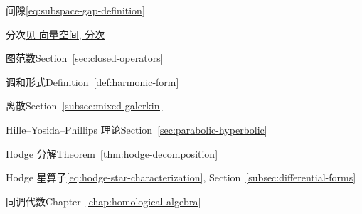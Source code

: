 \par\noindent\hspace*{0em}\label{index:gap}{间隙}\quad \eqref{eq:subspace-gap-definition}

\par\noindent\hspace*{0em}\label{index:grading}{分次}\quad \hyperref[index:vector-space-graded]{{见 向量空间, 分次}}

\par\noindent\hspace*{0em}\label{index:graph-norm}{图范数}\quad Section~\ref{sec:closed-operators}

\par\noindent\hspace*{0em}\label{index:harmonic-form}{调和形式}\quad Definition~\ref{def:harmonic-form}

\par\noindent\hspace*{1em}\label{index:harmonic-form-discrete}{离散}\quad Section~\ref{subsec:mixed-galerkin}

\par\noindent\hspace*{0em}\label{index:hille-yosida-phillips-theory}{Hille–Yosida–Phillips 理论}\quad Section~\ref{sec:parabolic-hyperbolic}

\par\noindent\hspace*{0em}\label{index:hodge-decomposition}{Hodge 分解}\quad Theorem~\ref{thm:hodge-decomposition}

\par\noindent\hspace*{0em}\label{index:hodge-star}{Hodge 星算子}\quad \eqref{eq:hodge-star-characterization}, Section~\ref{subsec:differential-forms}

\par\noindent\hspace*{0em}\label{index:homological-algebra}{同调代数}\quad Chapter~\ref{chap:homological-algebra}

